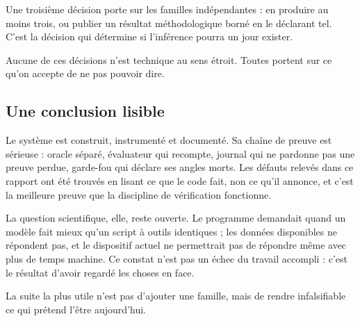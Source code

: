 Une troisième décision porte sur les familles indépendantes : en produire au
moins trois, ou publier un résultat méthodologique borné en le déclarant tel.
C'est la décision qui détermine si l'inférence pourra un jour exister.

Aucune de ces décisions n'est technique au sens étroit. Toutes portent sur ce
qu'on accepte de ne pas pouvoir dire.

\subsection{Une conclusion lisible}

Le système est construit, instrumenté et documenté. Sa chaîne de preuve est
sérieuse : oracle séparé, évaluateur qui recompte, journal qui ne pardonne pas
une preuve perdue, garde-fou qui déclare ses angles morts. Les défauts relevés
dans ce rapport ont été trouvés en lisant ce que le code fait, non ce qu'il
annonce, et c'est la meilleure preuve que la discipline de vérification
fonctionne.

La question scientifique, elle, reste ouverte. Le programme demandait quand un
modèle fait mieux qu'un script à outils identiques ; les données disponibles ne
répondent pas, et le dispositif actuel ne permettrait pas de répondre même avec
plus de temps machine. Ce constat n'est pas un échec du travail accompli : c'est
le résultat d'avoir regardé les choses en face.

La suite la plus utile n'est pas d'ajouter une famille, mais de rendre
infalsifiable ce qui prétend l'être aujourd'hui.
